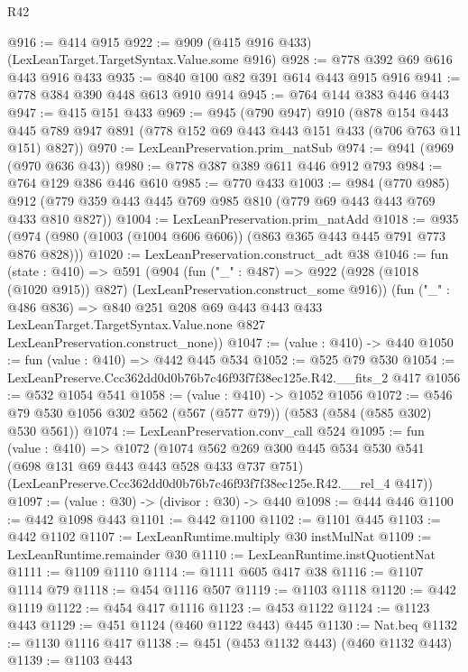 \begin{lexlean}{R42}
\begin{coremodule}
@916 := @414 @915
@922 := @909 (@415 @916 @433) (LexLeanTarget.TargetSyntax.Value.some @916)
@928 := @778 @392 @69 @616 @443 @916 @433
@935 := @840 @100 @82 @391 @614 @443 @915 @916
@941 := @778 @384 @390 @448 @613 @910 @914
@945 := @764 @144 @383 @446 @443
@947 := @415 @151 @433
@969 := @945
    (@790 @947)
    @910
    (@878
      @154
      @443
      @445
      @789
      @947
      @891
      (@778 @152 @69 @443 @443 @151 @433 (@706 @763 @11 @151) @827))
@970 := LexLeanPreservation.prim_natSub
@974 := @941 (@969 (@970 @636 @43))
@980 := @778 @387 @389 @611 @446 @912 @793
@984 := @764 @129 @386 @446 @610
@985 := @770 @433
@1003 := @984
    (@770 @985)
    @912
    (@779 @359 @443 @445 @769 @985 @810 (@779 @69 @443 @443 @769 @433 @810 @827))
@1004 := LexLeanPreservation.prim_natAdd
@1018 := @935 (@974 (@980 (@1003 (@1004 @606 @606)) (@863 @365 @443 @445 @791 @773 @876 @828)))
@1020 := LexLeanPreservation.construct_adt @38
@1046 := fun (state : @410) =>
  @591
    (@904
      (fun ("_" : @487) =>
      @922 (@928 (@1018 (@1020 @915)) @827) (LexLeanPreservation.construct_some @916))
      (fun ("_" : @486 @836) =>
      @840
        @251
        @208
        @69
        @443
        @443
        @433
        LexLeanTarget.TargetSyntax.Value.none
        @827
        LexLeanPreservation.construct_none))
@1047 := (value : @410) -> @440
@1050 := fun (value : @410) => @442 @445 @534
@1052 := @525 @79 @530
@1054 := LexLeanPreserve.Ccc362dd0d0b76b7c46f93f7f38ec125e.R42.__fits_2 @417
@1056 := @532 @1054 @541
@1058 := (value : @410) -> @1052 @1056
@1072 := @546 @79 @530 @1056 @302 @562 (@567 (@577 @79)) (@583 (@584 (@585 @302) @530 @561))
@1074 := LexLeanPreservation.conv_call @524
@1095 := fun (value : @410) =>
  @1072
    (@1074
      @562
      @269
      @300
      @445
      @534
      @530
      @541
      (@698 @131 @69 @443 @443 @528 @433 @737 @751)
      (LexLeanPreserve.Ccc362dd0d0b76b7c46f93f7f38ec125e.R42.__rel_4 @417))
@1097 := (value : @30) -> (divisor : @30) -> @440
@1098 := @444 @446
@1100 := @442 @1098 @443
@1101 := @442 @1100
@1102 := @1101 @445
@1103 := @442 @1102
@1107 := LexLeanRuntime.multiply @30 instMulNat
@1109 := LexLeanRuntime.remainder @30
@1110 := LexLeanRuntime.instQuotientNat
@1111 := @1109 @1110
@1114 := @1111 @605 @417 @38
@1116 := @1107 @1114 @79
@1118 := @454 @1116 @507
@1119 := @1103 @1118
@1120 := @442 @1119
@1122 := @454 @417 @1116
@1123 := @453 @1122
@1124 := @1123 @443
@1129 := @451 @1124 (@460 @1122 @443) @445
@1130 := Nat.beq
@1132 := @1130 @1116 @417
@1138 := @451 (@453 @1132 @443) (@460 @1132 @443)
@1139 := @1103 @443

\end{coremodule}
\end{lexlean}
